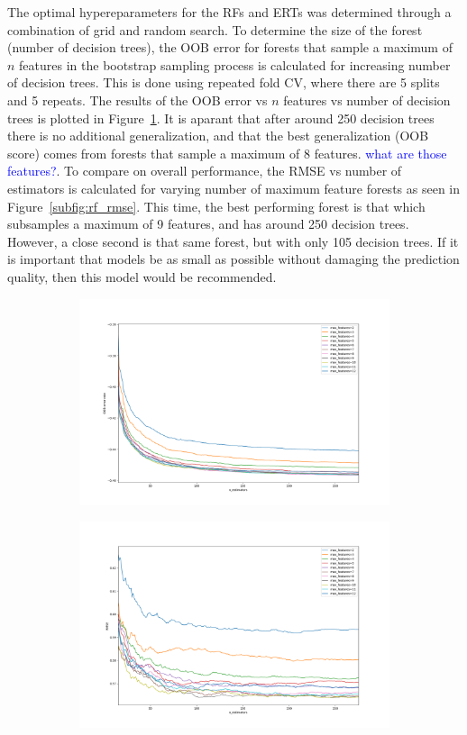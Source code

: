 \documentclass[a4paper, twoside, final, 12pt]{article}
\begin{document}
{The optimal hypereparameters for the RFs and ERTs was determined through a combination of grid and random search. 
To determine the size of the forest (number of decision trees), the OOB error for forests that sample a maximum of $n$ features in the bootstrap sampling process is calculated for increasing number of decision trees.
This is done using repeated fold CV, where there are 5 splits and 5 repeats.
The results of the OOB error vs $n$ features vs number of decision trees is plotted in Figure~\ref{subfig:rfoob}.
It is aparant that after around 250 decision trees there is no additional generalization, and that the best generalization (OOB score) comes from forests that sample a maximum of 8 features.
\textcolor{blue}{what are those features?}.
To compare on overall performance, the RMSE vs number of estimators is calculated for varying number of maximum feature forests as seen in Figure~\ref{subfig:rf_rmse}.
This time, the best performing forest is that which subsamples a maximum of 9 features, and has around 250 decision trees.
However, a close second is that same forest, but with only 105 decision trees.
If it is important that models be as small as possible without damaging the prediction quality, then this model would be recommended.
\begin{figure}
	\begin{subfigure}{0.48\linewidth}
		\centering
		\includegraphics[width=0.95\linewidth, keepaspectratio=true]{./src/RF_oob_error}
		\caption{}
		\label{subfig:rfoob}
	\end{subfigure}
	\begin{subfigure}{0.5\linewidth}
		\centering
		\includegraphics[width=0.95\linewidth, keepaspectratio=true]{./src/RF_RMSE_features_vs_num_estimators}

\end{subfigure}
\end{figure}}
\end{document}
